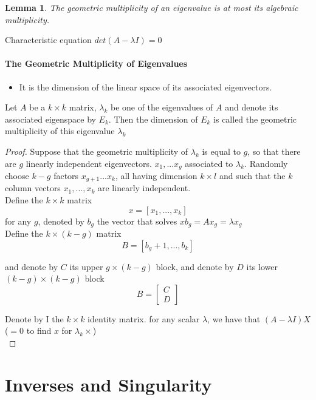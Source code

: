 \documentclass{article}
\newtheorem{lemma}[theorem]{Lemma}
\theoremstyle{definition}
\theoremstyle{remark}
\begin{document}
\begin{lemma}
    The geometric multiplicity of an eigenvalue is at most its algebraic multiplicity. 
\end{lemma}

Characteristic equation $det(A - \lambda I) = 0$

\paragraph{The Geometric Multiplicity of Eigenvalues}
\begin{itemize}
    \item It is the dimension of the linear space of its associated eigenvectors.
\end{itemize}

Let $A$ be a $k \times k$ matrix, $\lambda_k$ be one of the eigenvalues of $A$ and denote its associated eigenspace by $E_k$. Then the dimension of $E_k$ is called the geometric multiplicity of this eigenvalue $\lambda_k$ 


\begin{proof}
    Suppose that the geometric multiplicity of $\lambda_k$ is equal to $g$, so that there are $g$ linearly independent eigenvectors. $x_1,...x_g$ associated to $\lambda_k$. Randomly choose $k-g$ factors $x_{g+1}... x_k$, all having dimension $k \times l$ and such that the $k$ column vectors $x_1, ... ,x_k$ are linearly independent. \\

    Define the $k \times k$ matrix $$x = [x_1, ... , x_k]$$ for any $g$, denoted by $b_g$ the vector that solves $xb_g = Ax_g = \lambda x_g$ \\ 

    Define the $k \times (k-g)$ matrix $$B = [b_g+1, ... , b_k]$$

    and denote by $C$ its upper $g \times (k-g)$ block, and denote by $D$ its lower $(k-g) \times (k-g)$ block $$B = \begin{bmatrix}
        C \\ D
    \end{bmatrix}$$

    Denote by I the $k \times k$ identity matrix. for any scalar $\lambda$, we have that $(A- \lambda I)X$ ($= 0$ to find $x$ for $\lambda_k \times$) \\ 

    
    
\end{proof}


\section{Inverses and Singularity}
\end{document}
